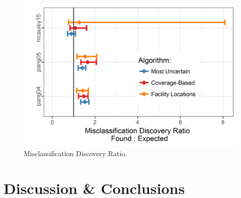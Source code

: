 \documentclass[letterpaper]{article} %
\begin{document}
\begin{figure}[hbtp]
  \includegraphics[width=.45\textwidth]{../experimentsAndPlots/discoveryRatioPlaceholder.png}
  \caption{Misclassification Discovery Ratio.}
  \label{fig:discratio}
\end{figure}



\section{Discussion \& Conclusions}



\newpage



\end{document}
